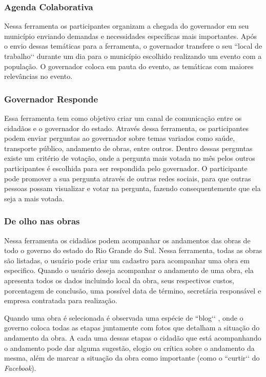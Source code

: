 \subsubsection{Agenda Colaborativa}
	
Nessa ferramenta os participantes organizam a chegada do governador em seu município enviando demandas e necessidades específicas mais importantes. Após o envio dessas temáticas para a ferramenta, o governador transfere o seu ``local de trabalho‘‘  durante um dia para o município escolhido realizando um evento com a população. O governador coloca em pauta do evento, as temáticas com maiores relevâncias no evento.

\subsubsection{Governador Responde}

Essa ferramenta tem como objetivo criar um canal de comunicação entre os cidadãos e o governador do estado. Através dessa ferramenta, os participantes podem enviar perguntas ao governador sobre temas variados como saúde, transporte público, andamento de obras, entre outros. Dentro dessas perguntas existe um critério de votação, onde a pergunta mais votada no mês pelos outros participantes é escolhida para ser respondida pelo governador. O participante pode promover a sua pergunta através de outras redes sociais, para que outras pessoas possam visualizar e votar na pergunta, fazendo consequentemente que ela seja a mais votada.
	
\subsubsection{De olho nas obras}

Nessa ferramenta os cidadãos podem acompanhar os andamentos das obras de todo o governo do estado do Rio Grande do Sul. Nessa ferramenta, todas as obras são listadas, o usuário pode criar um cadastro para acompanhar uma obra em especifico. Quando o usuário deseja acompanhar o andamento de uma obra, ela apresenta todos os dados incluindo local da obra, seus respectivos custos, porcentagem de conclusão, uma possível data de término, secretária responsável e empresa contratada para realização.
	
Quando uma obra é selecionada é observada uma espécie de ``blog‘‘ , onde o governo coloca todas as etapas juntamente com fotos que detalham a situação do andamento da obra. A cada uma dessas etapas o cidadão que está acompanhando o andamento pode dar alguma sugestão, elogio ou crítica sobre o andamento da mesma, além de marcar a situação da obra como importante (como o ``curtir‘‘  do \textit{Facebook}). 

